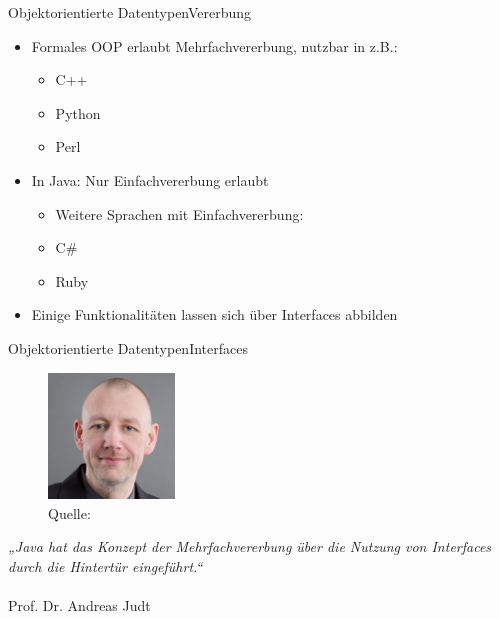 
\begin{frame}{Objektorientierte Datentypen}{Vererbung}
    \begin{itemize}
        \item Formales OOP erlaubt Mehrfachvererbung, nutzbar in z.B.:
        \begin{itemize}
            \item C++
            \item Python
            \item Perl
        \end{itemize}
        \item In Java: Nur Einfachvererbung erlaubt
        \begin{itemize}
            \item Weitere Sprachen mit Einfachvererbung:
            \item C\#
            \item Ruby
        \end{itemize}
        \item Einige Funktionalitäten lassen sich über Interfaces abbilden
    \end{itemize}
\end{frame}

\begin{frame}{Objektorientierte Datentypen}{Interfaces}
    \begin{minipage}{0.4\textwidth}
            \begin{figure}
                \includegraphics[height=3.35cm]{graph/judt}
                \caption*{Quelle: \cite{pic:judt}}
                \label{fig:ll}
            \end{figure}
        \end{minipage}
        \hfill
        \begin{minipage}{0.55\textwidth}
            \textit{„Java hat das Konzept der Mehrfachvererbung über die Nutzung von Interfaces durch die Hintertür eingeführt.“} \\\\Prof. Dr. Andreas Judt
        \end{minipage}
\end{frame}

